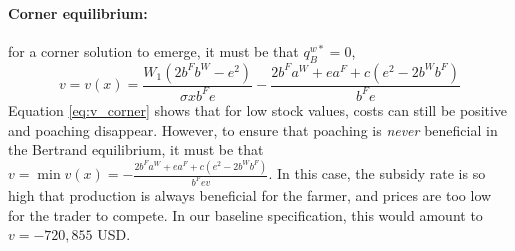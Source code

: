 
\paragraph{Corner equilibrium:}
for a corner solution to emerge, it must be that $q_B^{w*}=0$,
\begin{equation}
    v = v(x) = \frac{W_1(2b^F b^W - e^2)}{\sigma x b^F e} - \frac{2b^F a^W + ea^F + c(e^2 - 2b^W b^F)}{b^F e }
    \label{eq:v_corner}
\end{equation}
Equation \ref{eq:v_corner} shows that for low stock values, costs can still be positive and poaching disappear. However, to ensure that poaching is \textit{never} beneficial in the Bertrand equilibrium, it must be that $v = \min v(x) = - \frac{2b^F a^W + ea^F + c(e^2 - 2b^W b^F)}{b^F e v}$. In this case, the subsidy rate is so high that production is always beneficial for the farmer, and prices are too low for the trader to compete. In our baseline specification, this would amount to $v = - 720,855$ USD.  




